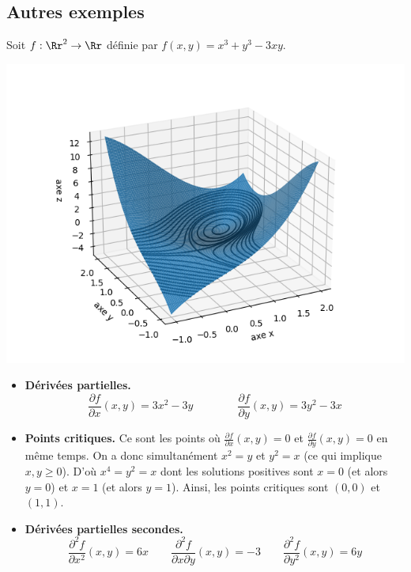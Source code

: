\documentclass[11pt, class=report,crop=false]{standalone}
\begin{document}
\subsection{Autres exemples}

\begin{exemple}
Soit $f: \Rr^2 \to \Rr$ définie par $f(x,y)=x^3+y^3-3xy$.


\begin{center}
\includegraphics[scale=\myscale,scale=0.8]{figures/fonctions-extrem-4}
\end{center}

	

\begin{itemize}
	\item \textbf{Dérivées partielles.}
    $$\frac{\partial f}{\partial x}(x,y) = 3x^2-3y \qquad\qquad
    \frac{\partial f}{\partial y}(x,y) = 3y^2-3x$$
    	
	\item \textbf{Points critiques.}
    Ce sont les points où $\frac{\partial f}{\partial x}(x,y) = 0$ et $\frac{\partial f}{\partial y}(x,y) = 0$ en même temps. On a donc simultanément $x^2=y$ et $y^2=x$ (ce qui implique $x,y\ge0$).
    D'où $x^4 = y^2 = x$ dont les solutions positives sont $x=0$ (et alors $y=0$) et $x=1$ (et alors $y=1$). Ainsi, les points critiques sont $(0,0)$ et $(1,1)$.
	
	\item \textbf{Dérivées partielles secondes.}
    $$\frac{\partial^2 f}{\partial x^2}(x,y) = 6x
    \qquad 
    \frac{\partial^2 f}{\partial x \partial y}(x,y) = -3
    \qquad
    \frac{\partial^2 f}{\partial y^2}(x,y) = 6y$$
	

\end{itemize}
\end{exemple}
\end{document}
